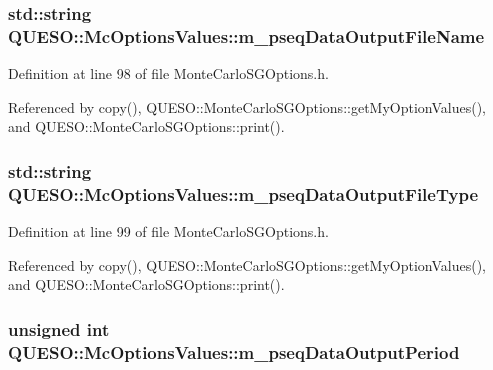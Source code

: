\hypertarget{class_q_u_e_s_o_1_1_mc_options_values_a8db3604c003959cb7ae7144a6bb37834}{
\subsubsection[{m\-\_\-pseq\-Data\-Output\-File\-Name}]{\setlength{\rightskip}{0pt plus 5cm}std\-::string Q\-U\-E\-S\-O\-::\-Mc\-Options\-Values\-::m\-\_\-pseq\-Data\-Output\-File\-Name}}\label{class_q_u_e_s_o_1_1_mc_options_values_a8db3604c003959cb7ae7144a6bb37834}


Definition at line 98 of file Monte\-Carlo\-S\-G\-Options.\-h.



Referenced by copy(), Q\-U\-E\-S\-O\-::\-Monte\-Carlo\-S\-G\-Options\-::get\-My\-Option\-Values(), and Q\-U\-E\-S\-O\-::\-Monte\-Carlo\-S\-G\-Options\-::print().

\hypertarget{class_q_u_e_s_o_1_1_mc_options_values_a7409d101fbe0676f87754234567dbc33}{
\subsubsection[{m\-\_\-pseq\-Data\-Output\-File\-Type}]{\setlength{\rightskip}{0pt plus 5cm}std\-::string Q\-U\-E\-S\-O\-::\-Mc\-Options\-Values\-::m\-\_\-pseq\-Data\-Output\-File\-Type}}\label{class_q_u_e_s_o_1_1_mc_options_values_a7409d101fbe0676f87754234567dbc33}


Definition at line 99 of file Monte\-Carlo\-S\-G\-Options.\-h.



Referenced by copy(), Q\-U\-E\-S\-O\-::\-Monte\-Carlo\-S\-G\-Options\-::get\-My\-Option\-Values(), and Q\-U\-E\-S\-O\-::\-Monte\-Carlo\-S\-G\-Options\-::print().

\hypertarget{class_q_u_e_s_o_1_1_mc_options_values_a7e7f833d945cdfecac2000196fae1aa8}{
\subsubsection[{m\-\_\-pseq\-Data\-Output\-Period}]{\setlength{\rightskip}{0pt plus 5cm}unsigned int Q\-U\-E\-S\-O\-::\-Mc\-Options\-Values\-::m\-\_\-pseq\-Data\-Output\-Period}}\label{class_q_u_e_s_o_1_1_mc_options_values_a7e7f833d945cdfecac2000196fae1aa8}


